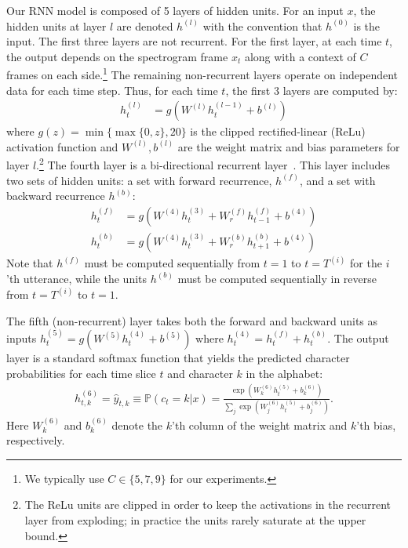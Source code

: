 \documentclass{article}
\begin{document}
Our RNN model is composed of 5 layers of hidden units.  For an input $x$, the
hidden units at layer $l$ are denoted $h^{(l)}$ with the convention that
$h^{(0)}$ is the input.  The first three layers are not recurrent.  For the
first layer, at each time $t$, the output depends on the spectrogram frame
$x_t$ along with a context of $C$ frames on each side.\footnote{We typically
use $C\in \{5, 7, 9\}$ for our experiments.} The remaining non-recurrent layers
operate on independent data for each time step.
    Thus, for each time $t$, the first 3 layers are computed by:
        \begin{align*}
            h^{(l)}_t &= g(W^{(l)} h^{(l-1)}_t + b^{(l)})
        \end{align*}
where $g(z) = \min\{\max\{0,z\}, 20\}$ is the clipped rectified-linear (ReLu)
activation function and $W^{(l)}, b^{(l)}$ are the weight matrix and bias
parameters for layer $l$.\footnote{The ReLu units are clipped in order to keep
the activations in the recurrent layer from exploding; in practice the units
rarely saturate at the upper bound.} The fourth layer is a bi-directional
recurrent layer~\cite{schuster1997bidirectional}.  This layer includes two sets
of hidden units:  a set with forward recurrence, $h^{(f)}$, and a set with
backward recurrence $h^{(b)}$:
    \begin{align*}
    h^{(f)}_t &= g(W^{(4)} h^{(3)}_t + W_r^{(f)} h^{(f)}_{t-1} + b^{(4)}) \\
    h^{(b)}_t &= g(W^{(4)} h^{(3)}_t + W_r^{(b)} h^{(b)}_{t+1} + b^{(4)})
    \end{align*}
Note that $h^{(f)}$ must be computed sequentially from $t=1$ to $t=T^{(i)}$ for
the $i$'th utterance, while the units $h^{(b)}$ must be computed sequentially
in reverse from $t=T^{(i)}$ to $t=1$.

The fifth (non-recurrent) layer takes both the forward and backward units as
inputs $h^{(5)}_t = g(W^{(5)} h^{(4)}_t + b^{(5)})$ where $h^{(4)}_t =
h^{(f)}_t + h^{(b)}_t$.  The output layer is a standard softmax function that
yields the predicted character probabilities for each time slice $t$ and
character $k$ in the alphabet:
\begin{align*}
h_{t,k}^{(6)} = \hat{y}_{t,k} \equiv \mathbb{P}(c_t = k|x) =  \frac{\exp(W_k^{(6)} h_t^{(5)}+b_k^{(6)})}{\sum_j \exp(W_j^{(6)} h_t^{(5)}+b_j^{(6)})}.
\end{align*}
Here $W_k^{(6)}$ and $b_k^{(6)}$ denote the $k$'th column of the weight matrix
and $k$'th bias, respectively.  
\end{document}
